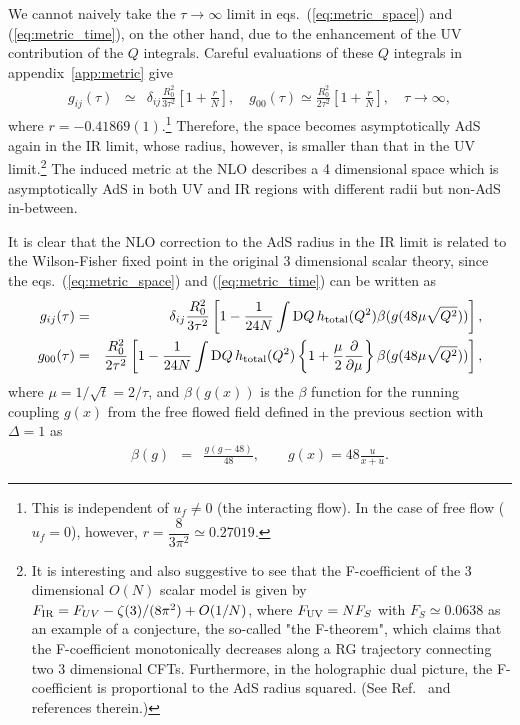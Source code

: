 \documentclass[preprint]{ptephy_v1}%
\newcommand{\rmD}{{\rm D}}
\begin{document}
We cannot naively take the $\tau\rightarrow\infty$ limit in eqs.~(\ref{eq:metric_space}) and (\ref{eq:metric_time}), 
on the other hand,  due to the enhancement of the UV contribution of the $Q$ integrals.
Careful evaluations of these $Q$ integrals in appendix~\ref{app:metric} give
\begin{eqnarray}
g_{ij}(\tau) &\simeq&\delta_{ij}\frac{R_0^2}{3\tau^2} \left[1 +\frac{r}{N}\right], \quad 
g_{00}(\tau) \simeq \frac{R_0^2}{2 \tau^2} \left[1 +\frac{r}{N}\right], \quad \tau\rightarrow \infty, 
\end{eqnarray}
where $r= -0.41869(1)$.\footnote{This is independent of  $u_f\not= 0$ (the interacting flow).
In the case of free flow ($u_f=0$), however, $r=\dfrac{8}{3\pi^2}\simeq0.27019$.}  
 Therefore, the space  becomes asymptotically AdS again in the IR limit, whose radius, however, is smaller than that in the UV limit.\footnote{It is interesting and also suggestive to see that the F-coefficient of the 3 dimensional $O(N)$ scalar model is given by $F_{\rm IR} = F_{UV} - \zeta(3)/(8\pi^2) + O(1/N)$, where $F_{\rm UV} = N F_S$ with $F_S\simeq 0.0638$ as an example of a conjecture, the so-called "the F-theorem", which claims that the F-coefficient monotonically decreases along a RG trajectory connecting two 3 dimensional  CFTs. Furthermore, in the holographic dual picture,  the F-coefficient is proportional to the AdS radius squared. (See Ref.~\cite{Pufu:2016zxm} and references therein.)
 }
The induced metric at the NLO describes a 4 dimensional space which is asymptotically AdS in both UV and IR regions with different radii but non-AdS in-between.

It is clear that the NLO correction to the AdS radius in the IR limit is related to the Wilson-Fisher fixed point in the original 3 dimensional scalar theory, since the eqs.~(\ref{eq:metric_space}) and (\ref{eq:metric_time}) can be written as
\begin{eqnarray}
g_{ij}(\tau) &=& \delta_{ij}\frac{R_0^2}{3 \tau^2} \left[1 -\frac{1}{24N}\int \rmD Q\, h_{\rm total}(Q^2)
\beta ( g ( 48 \mu\sqrt{Q^2}))\right], \\
g_{00}(\tau) &=& \frac{R_0^2}{2\tau^2} \left[1 -\frac{1}{24N}\int \rmD Q\, h_{\rm total}(Q^2)
\left\{ 1 +  \frac{\mu}{2}\frac{ \partial}{\partial \mu}\right\} \beta ( g (  48\mu\sqrt{Q^2}))
 \right] ,
\end{eqnarray}
where $\mu =1/\sqrt{t} =2/\tau$, and $\beta(g(x))$ is the $\beta$ function for the running coupling $g(x)$ from the free flowed field defined in the previous section with $\Delta=1$ as
\begin{eqnarray}
\beta(g) &=& \frac{g(g-48)}{48}, \qquad 
g(x) = 48 \frac{ u }{x+ u }.
\end{eqnarray}
\end{document}
